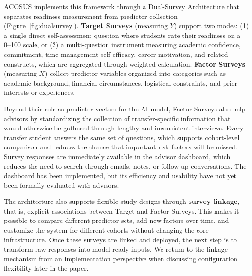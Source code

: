 \documentclass[letterpaper,11pt]{article}
\begin{document}
ACOSUS implements this framework through a Dual-Survey Architecture that separates readiness measurement from predictor collection (Figure~\ref{fig:dualsurvey}). \textbf{Target Surveys} (measuring $Y$) support two modes: (1) a single direct self-assessment question where students rate their readiness on a 0--100 scale, or (2) a multi-question instrument measuring academic confidence, commitment, time management self-efficacy, career motivation, and related constructs, which are aggregated through weighted calculation. \textbf{Factor Surveys} (measuring $X$) collect predictor variables organized into categories such as academic background, financial circumstances, logistical constraints, and prior interests or experiences.

Beyond their role as predictor vectors for the AI model, Factor Surveys also help advisors by standardizing the collection of transfer-specific information that would otherwise be gathered through lengthy and inconsistent interviews. Every transfer student answers the same set of questions, which supports cohort-level comparison and reduces the chance that important risk factors will be missed. Survey responses are immediately available in the advisor dashboard, which reduces the need to search through emails, notes, or follow-up conversations. The dashboard has been implemented, but its efficiency and usability have not yet been formally evaluated with advisors.

The architecture also supports flexible study designs through \textbf{survey linkage}, that is, explicit associations between Target and Factor Surveys. This makes it possible to compare different predictor sets, add new factors over time, and customize the system for different cohorts without changing the core infrastructure. Once these surveys are linked and deployed, the next step is to transform raw responses into model-ready inputs. We return to the linkage mechanism from an implementation perspective when discussing configuration flexibility later in the paper.
\end{document}
